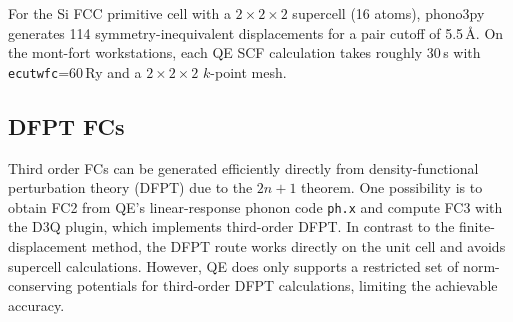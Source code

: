For the Si FCC primitive cell with a $2\times2\times2$ supercell
(16 atoms), phono3py generates 114 symmetry-inequivalent displacements
for a pair cutoff of 5.5\,\AA.  On the mont-fort workstations, each QE SCF
calculation takes roughly 30\,s  with
\texttt{ecutwfc}=60\,Ry and a $2\times2\times2$ $k$-point mesh.

\subsection{DFPT FCs}
\label{sec:dfpt}

Third order FCs can be generated efficiently directly from density-functional
perturbation theory (DFPT) due to the $2n+1$ theorem.  One possibility is to obtain FC2 from QE's linear-response phonon code \texttt{ph.x} and compute FC3 with the D3Q plugin,
which implements third-order DFPT.  In contrast to the
finite-displacement method, the DFPT route works directly on the unit
cell and avoids supercell calculations. However, QE does only supports a restricted set of
norm-conserving potentials for third-order DFPT calculations, limiting the achievable accuracy.

